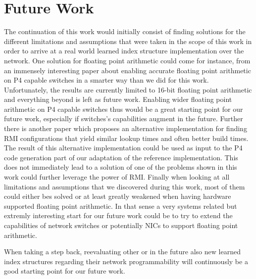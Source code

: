 \section{Future Work}
The continuation of this work would initially consist of finding solutions for the different limitations and assumptions that were taken in the scope of this work in order to arrive at a real world learned index structure implementation over the network. One solution for floating point arithmetic could come for instance, from an immensely interesting paper \cite{netfc} about enabling accurate floating point arithmetic on P4 capable switches in a smarter way than we did for this work. Unfortunately, the results are currently limited to 16-bit floating point arithmetic and everything beyond is left as future work. Enabling wider floating point arithmetic on P4 capable switches thus would be a great starting point for our future work, especially if switches's capabilities augment in the future. Further there is another paper \cite{maltry2021critical} which proposes an alternative implementation for finding RMI configurations that yield similar lookup times and often better build times. The result of this alternative implementation could be used as input to the P4 code generation part of our adaptation of the reference implementation. This does not immediately lead to a solution of one of the problems shown in this work could further leverage the power of RMI. Finally when looking at all limitations and assumptions that we discovered during this work, most of them could either bes solved or at least greatly weakened when having hardware supported floating point arithmetic. In that sense a very systems related but extremly interesting start for our future work could be to try to extend the capabilities of network switches or potentially NICs to support floating point arithmetic.

When taking a step back, reevaluating other or in the future also new learned index structures regarding their network programmability will continuously be a good starting point for our future work.
